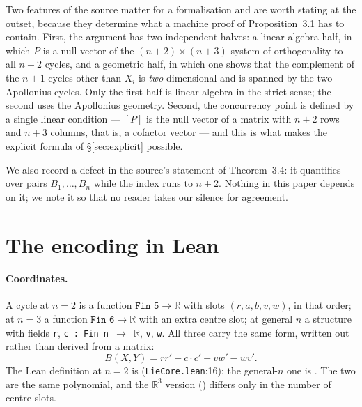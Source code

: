 \documentclass[11pt]{article}
\theoremstyle{definition}
\theoremstyle{remark}
\newcommand{\src}[3]{\texttt{#2}:#3}
\newcommand{\RR}{\mathbb{R}}
\begin{document}
Two features of the source matter for a formalisation and are worth stating at the outset, because
they determine what a machine proof of Proposition~3.1 has to contain. First, the argument has two
independent halves: a linear-algebra half, in which $P$ is a null vector of the $(n+2)\times(n+3)$
system of orthogonality to all $n+2$ cycles, and a geometric half, in which one shows that the
complement of the $n+1$ cycles other than $X_i$ is \emph{two}-dimensional and is spanned by the two
Apollonius cycles. Only the first half is linear algebra in the strict sense; the second uses the Apollonius
geometry. Second, the concurrency point is defined by a single linear condition --- $[P]$ is the null
vector of a matrix with $n+2$ rows and $n+3$ columns, that is, a cofactor vector --- and this is what
makes the explicit formula of \S\ref{sec:explicit} possible.

We also record a defect in the source's statement of Theorem~3.4: it quantifies over pairs
$B_1,\dots,B_n$ while the index runs to $n+2$. Nothing in this paper depends on it; we note it so
that no reader takes our silence for agreement.

\section{The encoding in Lean}\label{sec:encoding}

\paragraph{Coordinates.} A cycle at $n=2$ is a function $\texttt{Fin 5}\to\RR$ with slots
$(r,a,b,v,w)$, in that order; at $n=3$ a function $\texttt{Fin 6}\to\RR$ with an extra centre slot;
at general $n$ a structure  with fields \texttt{r}, \texttt{c : Fin n $\to$ $\RR$},
\texttt{v}, \texttt{w}. All three carry the same form, written out rather than derived from a matrix:
\begin{equation}\label{eq:leanB}
B(X,Y)=rr'-c\cdot c'-vw'-wv' .
\end{equation}
The Lean definition at $n=2$ is  (\src{PaperK}{LieCore.lean}{16}); the general-$n$
one is . The two are the same polynomial, and the $\RR^3$ version
() differs only in the number of centre slots.
\end{document}
